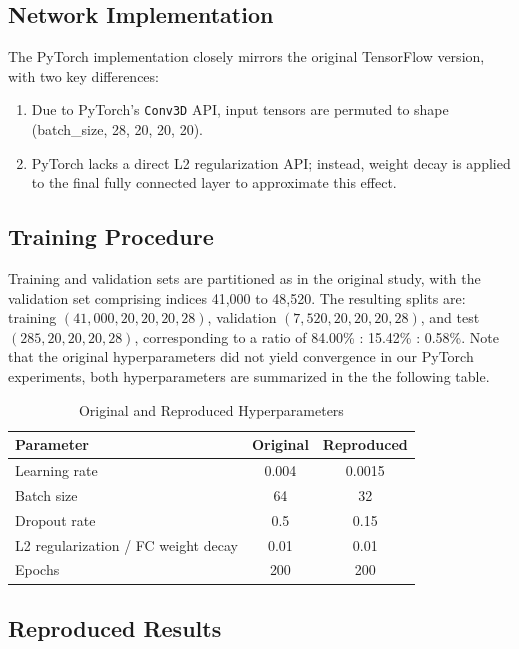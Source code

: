 \documentclass[unnumsec,webpdf,contemporary,large]{oup-authoring-template}
\theoremstyle{thmstyleone}%
\theoremstyle{thmstyletwo}%
\theoremstyle{thmstylethree}%
\begin{document}
\subsection{Network Implementation}
\vspace{0.5em}
The PyTorch implementation closely mirrors the original TensorFlow version, with two key differences:
\begin{enumerate}
    \item Due to PyTorch's \texttt{Conv3D} API, input tensors are permuted to shape (batch\_size, 28, 20, 20, 20).
    \item PyTorch lacks a direct L2 regularization API; instead, weight decay is applied to the final fully connected layer to approximate this effect.
\end{enumerate}

\subsection{Training Procedure}
\vspace{0.5em}
Training and validation sets are partitioned as in the original study, with the validation set comprising indices 41,000 to 48,520. The resulting splits are: training $(41,000, 20, 20, 20, 28)$, validation $(7,520, 20, 20, 20, 28)$, and test $(285, 20, 20, 20, 28)$, corresponding to a ratio of 84.00\% : 15.42\% : 0.58\%. 
Note that the original hyperparameters did not yield convergence in our PyTorch experiments, both hyperparameters are summarized in the the following table.

\begin{table}[H]
\centering
\caption{Original and Reproduced Hyperparameters}
\label{tab:hyperparams}
\begin{tabular}{lcc}
\toprule
Parameter & Original & Reproduced \\
\midrule
Learning rate & 0.004 & 0.0015 \\
Batch size & 64 & 32 \\
Dropout rate & 0.5 & 0.15 \\
L2 regularization / FC weight decay & 0.01 & 0.01 \\
Epochs & 200 & 200 \\
\bottomrule
\end{tabular}
\end{table}

\subsection{Reproduced Results}
\end{document}
